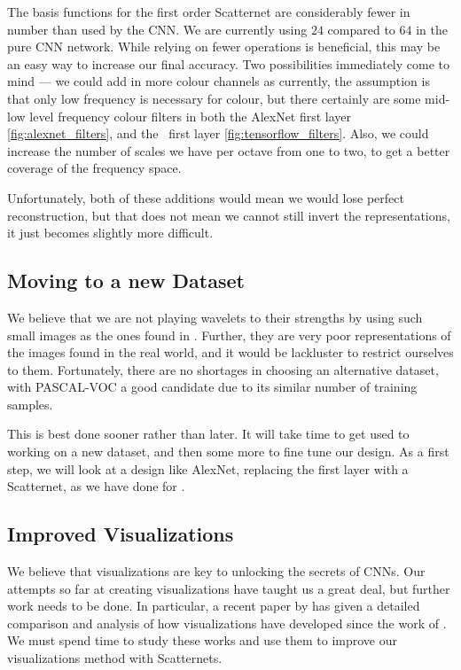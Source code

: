   The basis functions for the first order Scatternet are considerably fewer in
  number than used by the CNN\@. We are currently using $24$ compared to $64$
  in the pure CNN network. While relying on fewer operations is beneficial,
  this may be an easy way to increase our final accuracy. Two possibilities
  immediately come to mind --- we could add in more colour channels as
  currently, the assumption is that only low frequency is necessary for colour,
  but there certainly are some mid-low level frequency colour filters in both
  the AlexNet first layer \autoref{fig:alexnet_filters}, and the \cifar\ first
  layer \autoref{fig:tensorflow_filters}. Also, we could increase the number of
  scales we have per octave from one to two, to get a better coverage of the
  frequency space.
  
  Unfortunately, both of these additions would mean we would lose perfect
  reconstruction, but that does not mean we cannot still invert the
  representations, it just becomes slightly more difficult.

\subsection{Moving to a new Dataset}\label{sec:new_dataset}
  We believe that we are not playing wavelets to their strengths by using such
  small images as the ones found in \cifar. Further, they are very poor
  representations of the images found in the real world, and it would be
  lackluster to restrict ourselves to them. Fortunately, there are no shortages
  in choosing an alternative dataset, with PASCAL-VOC a good candidate due to
  its similar number of training samples.

  This is best done sooner rather than later. It will take time to get used to
  working on a new dataset, and then some more to fine tune our design. As
  a first step, we will look at a design like AlexNet, replacing the first layer with
  a Scatternet, as we have done for \cifar.

\subsection{Improved Visualizations}\label{sec:visualizations}
  We believe that visualizations are key to unlocking the secrets of CNNs. Our
  attempts so far at creating visualizations have taught us a great deal, but
  further work needs to be done. In particular, a recent paper by
  \citet{grun_taxonomy_2016} has given a detailed comparison and analysis of
  how visualizations have developed since the work of
  \citet{zeiler_visualizing_2014}. We must spend time to study these
  works and use them to improve our visualizations method with Scatternets.

